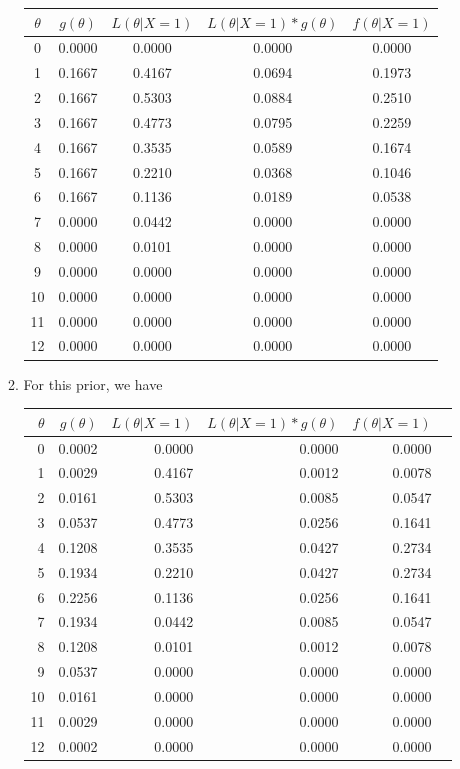 \documentclass[12pt]{article}\usepackage[]{graphicx}\usepackage[]{color}
\begin{document}
\begin{enumerate}
\begin{enumerate}[label=(\alph*)]
\begin{table}[ht]
\centering
\begin{tabular}{ccccc}
  \hline
$\theta$ & $g(\theta)$ & $L(\theta | X=1)$  & $L(\theta | X=1) * g(\theta)$ & $f(\theta | X=1)$ \\ 
  \hline
0 & 0.0000 & 0.0000 & 0.0000 & 0.0000 \\ 
1 & 0.1667 & 0.4167 & 0.0694 & 0.1973 \\ 
2 & 0.1667 & 0.5303 & 0.0884 & 0.2510 \\ 
3 & 0.1667 & 0.4773 & 0.0795 & 0.2259 \\ 
4 & 0.1667 & 0.3535 & 0.0589 & 0.1674 \\ 
5 & 0.1667 & 0.2210 & 0.0368 & 0.1046 \\ 
6 & 0.1667 & 0.1136 & 0.0189 & 0.0538 \\ 
7 & 0.0000 & 0.0442 & 0.0000 & 0.0000 \\ 
8 & 0.0000 & 0.0101 & 0.0000 & 0.0000 \\ 
9 & 0.0000 & 0.0000 & 0.0000 & 0.0000 \\ 
10 & 0.0000 & 0.0000 & 0.0000 & 0.0000 \\ 
11 & 0.0000 & 0.0000 & 0.0000 & 0.0000 \\ 
12 & 0.0000 & 0.0000 & 0.0000 & 0.0000 \\ 
   \hline
\end{tabular}
\end{table}

\newpage
\item For this prior, we have

\begin{table}[ht]
\centering
\begin{tabular}{rrrrrr}
  \hline
$\theta$ & $g(\theta)$ & $L(\theta | X=1)$  & $L(\theta | X=1) * g(\theta)$ & $f(\theta | X=1)$ \\
  \hline
0 & 0.0002 & 0.0000 & 0.0000 & 0.0000 \\ 
1 & 0.0029 & 0.4167 & 0.0012 & 0.0078 \\ 
2 & 0.0161 & 0.5303 & 0.0085 & 0.0547 \\ 
3 & 0.0537 & 0.4773 & 0.0256 & 0.1641 \\ 
4 & 0.1208 & 0.3535 & 0.0427 & 0.2734 \\ 
5 & 0.1934 & 0.2210 & 0.0427 & 0.2734 \\ 
6 & 0.2256 & 0.1136 & 0.0256 & 0.1641 \\ 
7 & 0.1934 & 0.0442 & 0.0085 & 0.0547 \\ 
8 & 0.1208 & 0.0101 & 0.0012 & 0.0078 \\ 
9 & 0.0537 & 0.0000 & 0.0000 & 0.0000 \\ 
10 & 0.0161 & 0.0000 & 0.0000 & 0.0000 \\ 
11 & 0.0029 & 0.0000 & 0.0000 & 0.0000 \\ 
12 & 0.0002 & 0.0000 & 0.0000 & 0.0000 \\ 
   \hline
\end{tabular}
\end{table}
\end{enumerate}


\end{enumerate}
\end{document}
